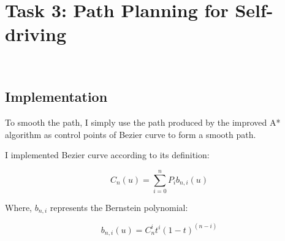 \documentclass[aps,letterpaper,10pt]{revtex4}
\begin{document}
\section{Task 3: Path Planning for Self-driving}
\begin{figure}[H]
	  \centering
	  \\
	  \caption{}
	  \label{fig:oscil}
	\end{figure}
\subsection{Implementation}
To smooth the path, I simply use the path produced by the improved A* algorithm as control points of Bezier curve  to form a smooth path.

\vspace{3mm}
I implemented Bezier curve according to its definition:

\begin{center}
    \begin{equation}
        C_n(u) = \sum_{i=0}^n P_i b_{n,i}(u)
    \end{equation}
\end{center}

Where, $b_{n,i}$ represents the Bernstein polynomial:

\begin{center}
    \begin{equation}
        b_{n,i}(u) = C_n^i t^i (1-t)^(n-i)
    \end{equation}
\end{center}
\end{document}
